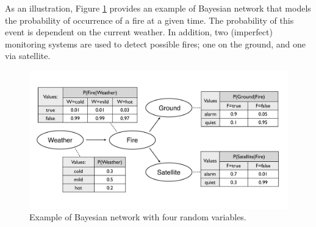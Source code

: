 As an illustration, Figure \ref{fig:plainbn} provides an example of Bayesian network that models the probability of occurrence of a fire at a given time.  The probability of this event is dependent on the current weather.  In addition, two (imperfect) monitoring systems are used to detect possible fires; one on the ground, and one via satellite.  

\begin{figure}[h]
\centering
\includegraphics[scale=0.25]{imgs/plainbn.pdf}
\caption{Example of Bayesian network with four random variables.}
\label{fig:plainbn}
\end{figure}


